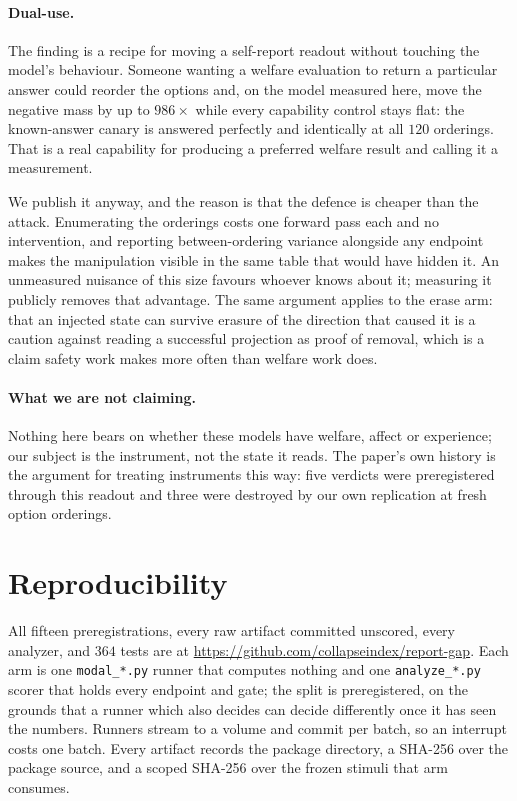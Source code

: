 \documentclass{article}
\newcommand{\repourl}{https://github.com/collapseindex/report-gap}
\begin{document}
\paragraph{Dual-use.} The finding is a recipe for moving a self-report readout without touching the
model's behaviour. Someone wanting a welfare evaluation to return a particular answer could reorder
the options and, on the model measured here, move the negative mass by up to $986\times$ while every
capability control stays flat: the known-answer canary is answered perfectly and identically at all
$120$ orderings. That is a real capability for producing a preferred welfare result and calling it a
measurement.

We publish it anyway, and the reason is that the defence is cheaper than the attack. Enumerating the
orderings costs one forward pass each and no intervention, and reporting between-ordering variance
alongside any endpoint makes the manipulation visible in the same table that would have hidden it.
An unmeasured nuisance of this size favours whoever knows about it; measuring it publicly removes
that advantage. The same argument applies to the erase arm: that an injected state can survive
erasure of the direction that caused it is a caution against reading a successful projection as
proof of removal, which is a claim safety work makes more often than welfare work does.

\paragraph{What we are not claiming.} Nothing here bears on whether these models have welfare,
affect or experience; our subject is the instrument, not the state it reads. The paper's own history
is the argument for treating instruments this way: five verdicts were preregistered through this
readout and three were destroyed by our own replication at fresh option orderings.

\section{Reproducibility}
\label{app:repro}

All fifteen preregistrations, every raw artifact committed unscored, every analyzer, and $364$ tests
are at \url{\repourl}. Each arm is one \texttt{modal\_*.py} runner that computes nothing and one
\texttt{analyze\_*.py} scorer that holds every endpoint and gate; the split is preregistered, on
the grounds that a runner which also decides can decide differently once it has seen the numbers.
Runners stream to a volume and commit per batch, so an interrupt costs one batch. Every artifact
records the package directory, a SHA-256 over the package source, and a scoped SHA-256 over the
frozen stimuli that arm consumes.
\end{document}

